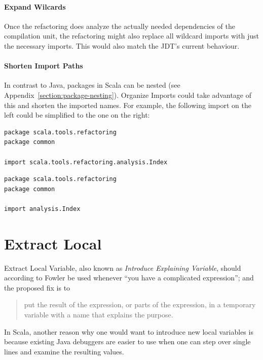 \documentclass[10pt,a4paper,oneside]{scrreprt}
\begin{document}
\paragraph{Expand Wilcards} Once the refactoring does analyze the actually needed dependencies of the compilation unit, the refactoring might also replace all wildcard imports with just the necessary imports. This would also match the JDT's current behaviour.

\paragraph{Shorten Import Paths} In contrast to Java, packages in Scala can be nested (see Appendix~\vref{section:package-nesting}). Organize Imports could take advantage of this and shorten the imported names. For example, the following import on the left could be simplified to the one on the right:

\begin{multicols}{2}
\begin{lstlisting}
package scala.tools.refactoring
package common

import scala.tools.refactoring.analysis.Index
\end{lstlisting}
\needspace{\baselineskip}
\begin{lstlisting}
package scala.tools.refactoring
package common

import analysis.Index
\end{lstlisting}
\end{multicols}


\section{Extract Local}

Extract Local Variable, also known as \textit{Introduce Explaining Variable}, should according to Fowler \cite{FowlerRefactoring} be used whenever ``you have a complicated expression''; and the proposed fix is to 

\begin{quotation}
put the result of the expression, or parts of the expression, in a temporary variable with a name that explains the purpose.
\end{quotation}

In Scala, another reason why one would want to introduce new local variables is because existing Java debuggers are easier to use when one can step over single lines and examine the resulting values.
\end{document}
